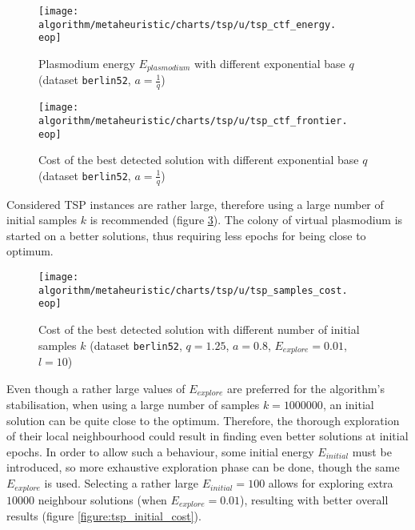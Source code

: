 \begin{figure}
  \centering

  \texttt{[image: algorithm/metaheuristic/charts/tsp/u/tsp\_ctf\_energy.\\eop]}

  \caption{Plasmodium energy $E_{plasmodium}$ with different exponential base $q$ (dataset \texttt{berlin52}, $a=\frac{1}{q}$)}
  \label{figure:tsp_ctf_energy}
\end{figure}

\begin{figure}
  \centering

  \texttt{[image: algorithm/metaheuristic/charts/tsp/u/tsp\_ctf\_frontier.\\eop]}

  \caption{Cost of the best detected solution with different exponential base $q$ (dataset \texttt{berlin52}, $a=\frac{1}{q}$)}
  \label{figure:tsp_ctf_frontier}
\end{figure}

Considered TSP instances are rather large, therefore using a large number of initial samples $k$ is recommended (figure \ref{figure:tsp_samples_cost}). The colony of virtual plasmodium is started on a better solutions, thus requiring less epochs for being close to optimum.

\begin{figure}
  \centering

  \texttt{[image: algorithm/metaheuristic/charts/tsp/u/tsp\_samples\_cost.\\eop]}

  \caption{Cost of the best detected solution with different number of initial samples $k$ (dataset \texttt{berlin52}, $q=1.25$, $a=0.8$, $E_{explore}=0.01$, $l=10$)}
  \label{figure:tsp_samples_cost}
\end{figure}

Even though a rather large values of $E_{explore}$ are preferred for the algorithm's stabilisation, when using a large number of samples $k=1000000$, an initial solution can be quite close to the optimum. Therefore, the thorough exploration of their local neighbourhood could result in finding even better solutions at initial epochs. In order to allow such a behaviour, some initial energy $E_{initial}$ must be introduced, so more exhaustive exploration phase can be done, though the same $E_{explore}$ is used. Selecting a rather large $E_{initial}=100$ allows for exploring extra $10000$ neighbour solutions (when $E_{explore}=0.01$), resulting with better overall results (figure \ref{figure:tsp_initial_cost}).


